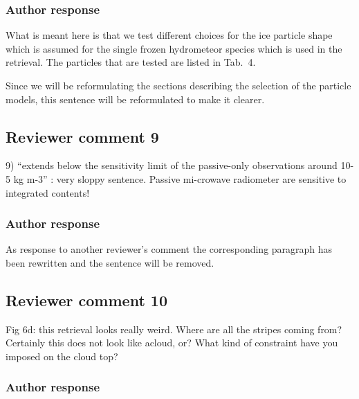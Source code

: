 \documentclass[11pt]{scrartcl}
\begin{document}
\subsubsection*{Author response}

What is meant here is that we test different choices for the ice particle shape
which is assumed for the single frozen hydrometeor species which is used in the
retrieval. The particles that are tested are listed in Tab.~4.

Since we will be reformulating the sections describing the selection of the
particle models, this sentence will be reformulated to make it clearer.

\subsection*{Reviewer comment 9}
9) “extends below the sensitivity limit of the passive-only observations around 10-5 kg m-3” : very sloppy sentence. Passive mi-crowave radiometer are sensitive to integrated contents! 

\subsubsection*{Author response}

As response to another reviewer's comment the corresponding paragraph has been
rewritten and the sentence will be removed.



\subsection*{Reviewer comment 10}

 Fig 6d: this retrieval looks really weird. Where are all the stripes coming
 from? Certainly this does not look like acloud, or? What kind of constraint
 have you imposed on the cloud top?

\subsubsection*{Author response}
\end{document}
